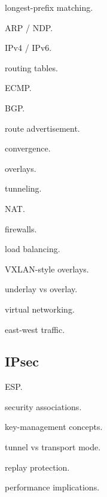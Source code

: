 \documentclass[11pt,letterpaper]{article}
\begin{document}
\begin{topics}

\item longest-prefix matching.

\item ARP / NDP.

\item IPv4 / IPv6.

\item routing tables.

\item ECMP.

\item BGP.

\item route advertisement.

\item convergence.

\item overlays.

\item tunneling.

\item NAT.

\item firewalls.

\item load balancing.

\item VXLAN-style overlays.

\item underlay vs overlay.

\item virtual networking.

\item east-west traffic.

\end{topics}

\subsection*{IPsec}

\begin{topics}

\item ESP.

\item security associations.

\item key-management concepts.

\item tunnel vs transport mode.

\item replay protection.

\item performance implications.

\end{topics}
\end{document}
